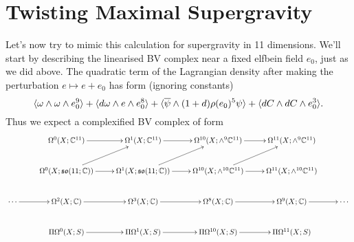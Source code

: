 \documentclass[10pt, oneside]{article}
\begin{document}
\section{Twisting Maximal Supergravity}
Let's now try to mimic this calculation for supergravity in 11 dimensions.  We'll start by describing the linearised BV complex near a fixed elfbein field $e_0$, just as we did above.  The quadratic term of the Lagrangian density after making the perturbation $e \mapsto e + e_0$ has form (ignoring constants)
\[\langle \omega \wedge \omega \wedge e_0^9 \rangle + \langle d\omega \wedge e \wedge e_0^8 \rangle + \langle \overline{\psi} \wedge (1+d)\rho(e_0)^5 \psi \rangle + \langle dC \wedge dC \wedge e_0^3 \rangle.\]
Thus we expect a complexified BV complex of form
\[\xymatrix{
&\Omega^0(X; \CC^{11}) \ar[r] &\Omega^1(X;\CC^{11}) \ar[r] &\Omega^{10}(X; \wedge^9\CC^{11}) \ar[r] &\Omega^{11}(X;\wedge^9\CC^{11}) &\\
&\Omega^0(X; \so(11;\CC)) \ar[r] \ar[ur] &\Omega^1(X;\so(11;\CC)) \ar[r] \ar[ur] &\Omega^{10}(X; \wedge^{10}\CC^{11}) \ar[r] \ar[ur] &\Omega^{11}(X;\wedge^{10}\CC^{11}) &\\
\cdots\ar[r] &\Omega^2(X;\CC) \ar[r] &\Omega^3(X;\CC) \ar[r] &\Omega^8(X;\CC) \ar[r] &\Omega^9(X;\CC) \ar[r] &\cdots \\
&\Pi\Omega^0(X; S) \ar[r] &\Pi\Omega^1(X;S) \ar[r] &\Pi\Omega^{10}(X; S) \ar[r] &\Pi\Omega^{11}(X;S) &\\
}\]
\end{document}
